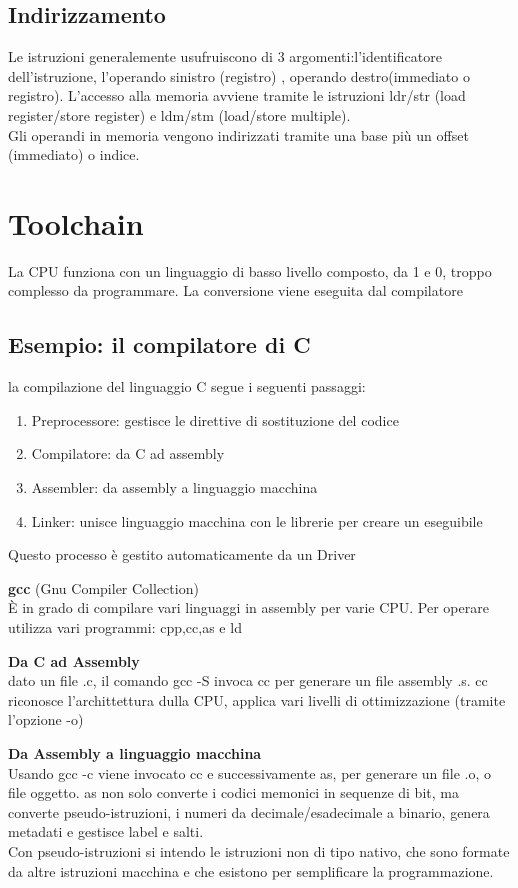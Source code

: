 \documentclass[12pt, a4paper]{article}
\begin{document}
\subsection{Indirizzamento}
Le istruzioni generalemente usufruiscono di 3 argomenti:l'identificatore dell'istruzione, l'operando sinistro (registro)
, operando destro(immediato o registro). L'accesso alla memoria avviene tramite le istruzioni ldr/str 
(load register/store register) e ldm/stm (load/store multiple).\\Gli operandi in memoria vengono indirizzati tramite
una base più un offset (immediato) o indice.




\newpage
{}
\section{Toolchain}
La CPU funziona con un linguaggio di basso livello composto, da 1 e 0, troppo complesso da programmare. La conversione
viene eseguita dal compilatore

\subsection{Esempio: il compilatore di C}
la compilazione del linguaggio C segue i seguenti passaggi:
\begin{enumerate}
  \item Preprocessore: gestisce le direttive di sostituzione del codice
  \item Compilatore: da C ad assembly 
  \item Assembler: da assembly a linguaggio macchina
  \item Linker: unisce linguaggio macchina con le librerie per creare un eseguibile
\end{enumerate}
Questo processo è gestito automaticamente da un Driver

\textbf{gcc} (Gnu Compiler Collection)\\ È in grado di compilare vari linguaggi in assembly per varie CPU. Per 
operare utilizza vari programmi: cpp,cc,as e ld 

\textbf{Da C ad Assembly}\\ dato un file .c, il comando gcc -S invoca cc per generare un file assembly .s.
cc riconosce l'archittettura dulla CPU, applica vari livelli di ottimizzazione (tramite l'opzione -o)

\textbf{Da Assembly a linguaggio macchina}\\ Usando gcc -c viene invocato cc e successivamente as, per generare un
file .o, o file oggetto. as non solo converte i codici memonici in sequenze di bit, ma converte pseudo-istruzioni,
i numeri da decimale/esadecimale a binario, genera metadati e gestisce label e salti.\\
Con pseudo-istruzioni si intendo le istruzioni non di tipo nativo, che sono formate da altre istruzioni macchina
e che esistono per semplificare la programmazione.
\end{document}
